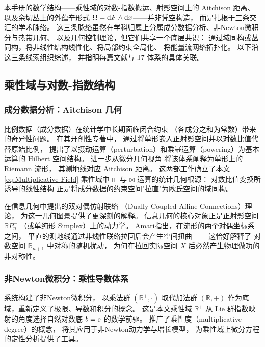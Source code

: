 ﻿\documentclass[10pt,a4paper]{article}
\newcommand{\sqplus}{\mathbin{\boxplus}}
\newcommand{\sqtimes}{\mathbin{\boxtimes}}
\begin{document}
本手册的数学结构——乘性域的对数-指数搬运、射影空间上的 Aitchison 距离、
以及余切丛上的外蕴辛形式 $\Omega = \text dF \wedge \text dx$——并非凭空构造，
而是扎根于三条交汇的学术脉络。
这三条脉络虽然在学科归属上分属成分数据分析、非Newton微积分与热带几何、
以及几何控制理论，但它们共享一个底层共识：
通过域同构或丛同构，将非线性结构线性化、将局部约束全局化、
将能量流网络拓扑化。
以下沿这三条线索组织综述，
并指明每篇文献与 J7 体系的具体关联。

\subsection{乘性域与对数-指数结构}

\subsubsection{成分数据分析：Aitchison 几何}

比例数据（成分数据）在统计学中长期面临闭合约束
（各成分之和为常数）带来的奇异性问题。
\textcite{Aitchison1986} 在其开创性专著中，
通过将单形嵌入正射影空间并以对数比值代替原始比例，
提出了以摄动运算（perturbation）和乘幂运算（powering）为基本运算的
Hilbert 空间结构。
\textcite{PawlowskyGlahnEgozcue2001} 进一步从微分几何视角
将该体系阐释为单形上的 Riemann 流形，
其测地线对应 Aitchison 距离。
这两部工作确立了本文 \eqref{eq:Multiplicative-Field} 乘性域中
$\sqplus$ 与 $\sqtimes$ 运算的统计几何根源：
对数比值变换所诱导的线性结构
正是将成分数据的约束空间"拉直"为欧氏空间的域同构。

\textcite{Amari2016} 在信息几何中提出的双对偶仿射联络
（Dually Coupled Affine Connections）理论，
为这一几何图景提供了更深刻的解释。
信息几何的核心对象正是正射影空间 $\mathbb R P^+_n$
（或单纯形 Simplex）上的动力学。
Amari指出，在流形的两个对偶坐标系之间，
平直的测地线通过非线性联络拉回后会产生空间扭曲——
这恰好解释了
对数空间 $\mathbb R_{n+1}$ 中对称的随机扰动，
为何在拉回实际空间 $X$ 后必然产生物理做功的非对称性。

\subsubsection{非Newton微积分：乘性导数体系}

\textcite{GrossmanKatz1972} 系统构建了非Newton微积分，
以乘法群 $(\mathbb R^+,\cdot)$ 取代加法群 $(\mathbb R,+)$
作为底域，重新定义了极限、导数和积分的概念。
这是本文乘性域 $\boxed{\mathbb R^+}$
从 Lie 群指数映射的角度选择自然对数底 $b=\text e$ 的数学前驱。
\textcite{CordovaLepe2006} 推广了乘性度（multiplicative degree）的概念，
将其应用于非Newton动力学与增长模型，
为乘性域上微分方程的定性分析提供了工具。
\end{document}
